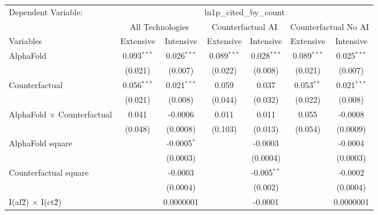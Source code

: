 \begingroup
\centering
\begin{tabular}{lcccccc}
   \tabularnewline \midrule \midrule
   Dependent Variable: & \multicolumn{6}{c}{ln1p\_cited\_by\_count}\\
 & \multicolumn{2}{c}{All Technologies} & \multicolumn{2}{c}{Counterfactual AI} & \multicolumn{2}{c}{Counterfactual No AI} \\
\cmidrule(lr){1-1}\cmidrule(lr){2-3} \cmidrule(lr){4-5} \cmidrule(lr){6-7}
Variables & \multicolumn{1}{c}{Extensive} & \multicolumn{1}{c}{Intensive} & \multicolumn{1}{c}{Extensive} & \multicolumn{1}{c}{Intensive} & \multicolumn{1}{c}{Extensive} & \multicolumn{1}{c}{Intensive} \\
\cmidrule(lr){1-1}\cmidrule(lr){2-2} \cmidrule(lr){3-3} \cmidrule(lr){4-4} \cmidrule(lr){5-5} \cmidrule(lr){6-6} \cmidrule(lr){7-7}
   AlphaFold                          & 0.093$^{***}$ & 0.026$^{***}$ & 0.089$^{***}$ & 0.028$^{***}$ & 0.089$^{***}$ & 0.025$^{***}$\\   
                                      & (0.021)       & (0.007)       & (0.022)       & (0.008)       & (0.021)       & (0.007)\\   
   Counterfactual                     & 0.056$^{***}$ & 0.021$^{***}$ & 0.059         & 0.037         & 0.053$^{**}$  & 0.021$^{***}$\\   
                                      & (0.021)       & (0.008)       & (0.044)       & (0.032)       & (0.022)       & (0.008)\\   
   AlphaFold $\times$ Counterfactual  & 0.041         & -0.0006       & 0.011         & 0.011         & 0.055         & -0.0008\\   
                                      & (0.048)       & (0.0008)      & (0.103)       & (0.013)       & (0.054)       & (0.0009)\\   
   AlphaFold square                   &               & -0.0005$^{*}$ &               & -0.0003       &               & -0.0004\\   
                                      &               & (0.0003)      &               & (0.0004)      &               & (0.0003)\\   
   Counterfactual square              &               & -0.0003       &               & -0.005$^{**}$ &               & -0.0002\\   
                                      &               & (0.0004)      &               & (0.002)       &               & (0.0004)\\   
   I(af\^2) $\times$ I(ct\^2)         &               & 0.0000001     &               & -0.0001       &               & 0.0000001\\   

\end{tabular}
